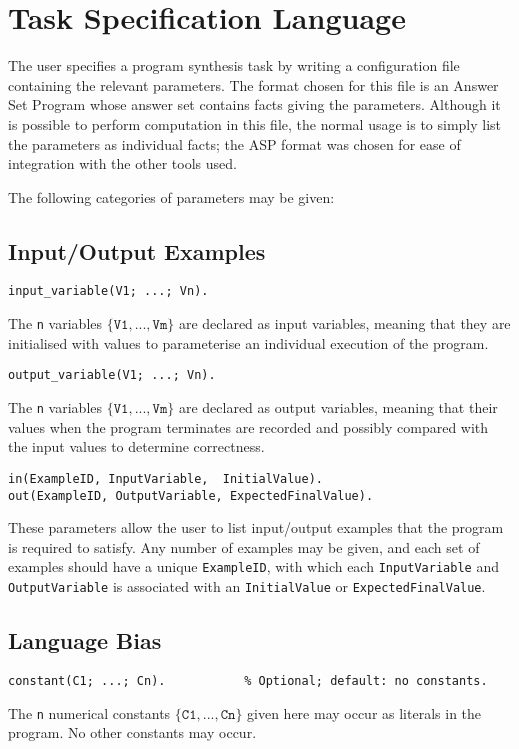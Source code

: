 \documentclass[a4paper,twoside,notitlepage]{report}
\newcommand{\ttt}{\texttt}
\begin{document}
\section{Task Specification Language} \label{sec:spclng}
The user specifies a program synthesis task by writing a configuration file 
containing the relevant parameters. The format chosen for this file is an 
Answer Set Program whose answer set contains facts giving the parameters. 
Although it is possible to perform computation in this file, the normal usage 
is to simply list the parameters as individual facts; the ASP format was 
chosen for ease of integration with the other tools used.

The following categories of parameters may be given:

\subsection{Input/Output Examples}

\begin{Verbatim}[samepage=true]
input_variable(V1; ...; Vn).
\end{Verbatim}
The \ttt{n} variables $\{\ttt{V1}, ..., \ttt{Vm}\}$ are declared as input 
variables, meaning that they are initialised with values to parameterise an 
individual execution of the program.

\begin{Verbatim}[samepage=true]
output_variable(V1; ...; Vn).
\end{Verbatim}
The \ttt{n} variables $\{\ttt{V1}, ..., \ttt{Vm}\}$ are declared as output
variables, meaning that their values when the program terminates are recorded
and possibly compared with the input values to determine correctness.

\begin{Verbatim}[samepage=true]
 in(ExampleID, InputVariable,  InitialValue).
out(ExampleID, OutputVariable, ExpectedFinalValue).
\end{Verbatim}
These parameters allow the user to list input/output examples that the program 
is required to satisfy. Any number of examples may be given, and each set of 
examples should have a unique \ttt{ExampleID}, with which each 
\ttt{InputVariable} and \ttt{OutputVariable} is associated with an 
\ttt{InitialValue} or \ttt{ExpectedFinalValue}.

\subsection{Language Bias}
\begin{Verbatim}[samepage=true]
constant(C1; ...; Cn).           % Optional; default: no constants.
\end{Verbatim}
The \ttt{n} numerical constants $\{\ttt{C1}, ..., \ttt{Cn}\}$ 
given here may occur as literals in the program. No other constants may occur.
\end{document}
